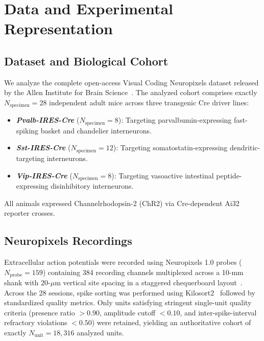 \documentclass[10pt,journal,compsoc]{IEEEtran}
\begin{document}
\section{Data and Experimental Representation}

\subsection{Dataset and Biological Cohort}
We analyze the complete open-access Visual Coding Neuropixels dataset released by the Allen Institute for Brain Science~\cite{siegle2021survey}. The analyzed cohort comprises exactly $N_{\text{specimen}} = 28$ independent adult mice across three transgenic Cre driver lines:
\begin{itemize}
    \item \textbf{\textit{Pvalb-IRES-Cre}} ($N_{\text{specimen}} = 8$): Targeting parvalbumin-expressing fast-spiking basket and chandelier interneurons.
    \item \textbf{\textit{Sst-IRES-Cre}} ($N_{\text{specimen}} = 12$): Targeting somatostatin-expressing dendritic-targeting interneurons.
    \item \textbf{\textit{Vip-IRES-Cre}} ($N_{\text{specimen}} = 8$): Targeting vasoactive intestinal peptide-expressing disinhibitory interneurons.
\end{itemize}
All animals expressed Channelrhodopsin-2 (ChR2) via Cre-dependent Ai32 reporter crosses.

\subsection{Neuropixels Recordings}
Extracellular action potentials were recorded using Neuropixels 1.0 probes ($N_{\text{probe}} = 159$) containing 384 recording channels multiplexed across a 10-mm shank with $20$-$\mu\text{m}$ vertical site spacing in a staggered chequerboard layout~\cite{jun2017fully}. Across the 28 sessions, spike sorting was performed using Kilosort2~\cite{pachitariu2016fast,pachitariu2024spike} followed by standardized quality metrics. Only units satisfying stringent single-unit quality criteria (presence ratio $>0.90$, amplitude cutoff $<0.10$, and inter-spike-interval refractory violations $<0.50$) were retained, yielding an authoritative cohort of exactly $N_{\text{unit}} = 18,316$ analyzed units.
\end{document}
